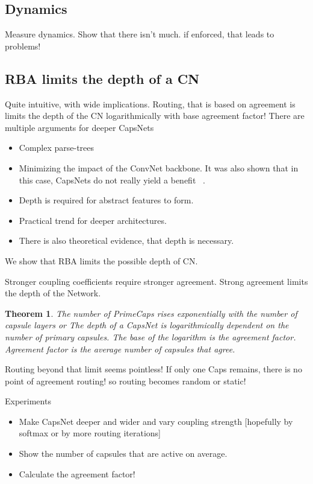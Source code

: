 \documentclass{article}
\newtheorem{theorem}{Theorem}
\begin{document}
\subsection*{Dynamics}
Measure dynamics. Show that there isn't much. if enforced, that leads to problems!


\subsection{RBA limits the depth of a CN}


Quite intuitive, with wide implications.
Routing, that is based on agreement is limits the depth of the CN logarithmically with base agreement factor!
There are multiple arguments for deeper CapsNets
\begin{itemize}
	\item Complex parse-trees
	\item Minimizing the impact of the ConvNet backbone. It was also shown that in this case, CapsNets do not really yield a benefit ~\cite{acml/PaikKK19}.
	\item Depth is required for abstract features to form.
	\item Practical trend for deeper architectures.
	\item There is also theoretical evidence, that depth is necessary.
\end{itemize}
We show that RBA limits the possible depth of CN.

Stronger coupling coefficients require stronger agreement. 
Strong agreement limits the depth of the Network.

\begin{theorem}
	The number of PrimeCaps rises exponentially with the number of capsule layers or
	The depth of a CapsNet is logarithmically dependent on the number of primary capsules.
	The base of the logarithm is the agreement factor.
	Agreement factor is the average number of capsules that agree.
\end{theorem}
Routing beyond that limit seems pointless!
If only one Caps remains, there is no point of agreement routing! so routing becomes random or static!

Experiments
\begin{itemize}
	\item Make CapsNet deeper and wider and vary coupling strength [hopefully by softmax or by more routing iterations]
	\item Show the number of capsules that are active on average.
	\item Calculate the agreement factor!
\end{itemize}
\end{document}
